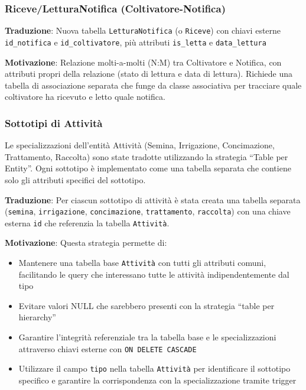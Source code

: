 \documentclass[12pt,a4paper]{article}
\begin{document}
\subsubsection{Riceve/LetturaNotifica (Coltivatore-Notifica)}

\textbf{Traduzione}: Nuova tabella \texttt{LetturaNotifica} (o \texttt{Riceve}) con chiavi esterne \texttt{id\_notifica} e \texttt{id\_coltivatore}, più attributi \texttt{is\_letta} e \texttt{data\_lettura}

\textbf{Motivazione}: Relazione molti-a-molti (N:M) tra Coltivatore e Notifica, con attributi propri della relazione (stato di lettura e data di lettura). Richiede una tabella di associazione separata che funge da classe associativa per tracciare quale coltivatore ha ricevuto e letto quale notifica.

\subsubsection{Sottotipi di Attività}

Le specializzazioni dell'entità Attività (Semina, Irrigazione, Concimazione, Trattamento, Raccolta) sono state tradotte utilizzando la strategia ``Table per Entity''. Ogni sottotipo è implementato come una tabella separata che contiene solo gli attributi specifici del sottotipo.

\textbf{Traduzione}: Per ciascun sottotipo di attività è stata creata una tabella separata (\texttt{semina}, \texttt{irrigazione}, \texttt{concimazione}, \texttt{trattamento}, \texttt{raccolta}) con una chiave esterna \texttt{id} che referenzia la tabella \texttt{Attività}.

\textbf{Motivazione}: Questa strategia permette di:
\begin{itemize}
    \item Mantenere una tabella base \texttt{Attività} con tutti gli attributi comuni, facilitando le query che interessano tutte le attività indipendentemente dal tipo
    \item Evitare valori NULL che sarebbero presenti con la strategia ``table per hierarchy''
    \item Garantire l'integrità referenziale tra la tabella base e le specializzazioni attraverso chiavi esterne con \texttt{ON DELETE CASCADE}
    \item Utilizzare il campo \texttt{tipo} nella tabella \texttt{Attività} per identificare il sottotipo specifico e garantire la corrispondenza con la specializzazione tramite trigger
\end{itemize}
\end{document}
